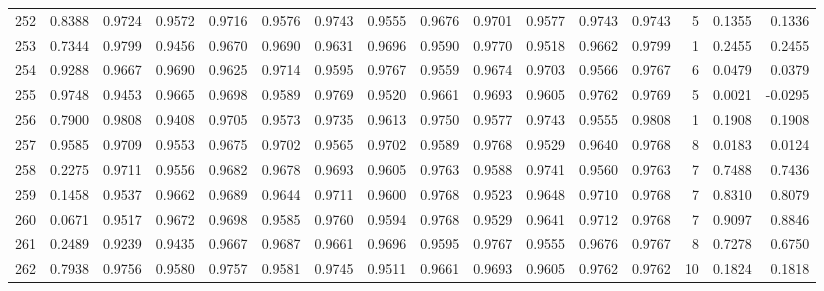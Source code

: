\begin{tabular}{lrrrrrrrrrrrrrrr}
252 &      0.8388 &  0.9724 &  0.9572 &  0.9716 &  0.9576 &  0.9743 &  0.9555 &  0.9676 &  0.9701 &  0.9577 &   0.9743 &     0.9743 &      5 &                    0.1355 &                     0.1336 \\
253 &      0.7344 &  0.9799 &  0.9456 &  0.9670 &  0.9690 &  0.9631 &  0.9696 &  0.9590 &  0.9770 &  0.9518 &   0.9662 &     0.9799 &      1 &                    0.2455 &                     0.2455 \\
254 &      0.9288 &  0.9667 &  0.9690 &  0.9625 &  0.9714 &  0.9595 &  0.9767 &  0.9559 &  0.9674 &  0.9703 &   0.9566 &     0.9767 &      6 &                    0.0479 &                     0.0379 \\
255 &      0.9748 &  0.9453 &  0.9665 &  0.9698 &  0.9589 &  0.9769 &  0.9520 &  0.9661 &  0.9693 &  0.9605 &   0.9762 &     0.9769 &      5 &                    0.0021 &                    -0.0295 \\
256 &      0.7900 &  0.9808 &  0.9408 &  0.9705 &  0.9573 &  0.9735 &  0.9613 &  0.9750 &  0.9577 &  0.9743 &   0.9555 &     0.9808 &      1 &                    0.1908 &                     0.1908 \\
257 &      0.9585 &  0.9709 &  0.9553 &  0.9675 &  0.9702 &  0.9565 &  0.9702 &  0.9589 &  0.9768 &  0.9529 &   0.9640 &     0.9768 &      8 &                    0.0183 &                     0.0124 \\
258 &      0.2275 &  0.9711 &  0.9556 &  0.9682 &  0.9678 &  0.9693 &  0.9605 &  0.9763 &  0.9588 &  0.9741 &   0.9560 &     0.9763 &      7 &                    0.7488 &                     0.7436 \\
259 &      0.1458 &  0.9537 &  0.9662 &  0.9689 &  0.9644 &  0.9711 &  0.9600 &  0.9768 &  0.9523 &  0.9648 &   0.9710 &     0.9768 &      7 &                    0.8310 &                     0.8079 \\
260 &      0.0671 &  0.9517 &  0.9672 &  0.9698 &  0.9585 &  0.9760 &  0.9594 &  0.9768 &  0.9529 &  0.9641 &   0.9712 &     0.9768 &      7 &                    0.9097 &                     0.8846 \\
261 &      0.2489 &  0.9239 &  0.9435 &  0.9667 &  0.9687 &  0.9661 &  0.9696 &  0.9595 &  0.9767 &  0.9555 &   0.9676 &     0.9767 &      8 &                    0.7278 &                     0.6750 \\
262 &      0.7938 &  0.9756 &  0.9580 &  0.9757 &  0.9581 &  0.9745 &  0.9511 &  0.9661 &  0.9693 &  0.9605 &   0.9762 &     0.9762 &     10 &                    0.1824 &                     0.1818 \\

\end{tabular}
